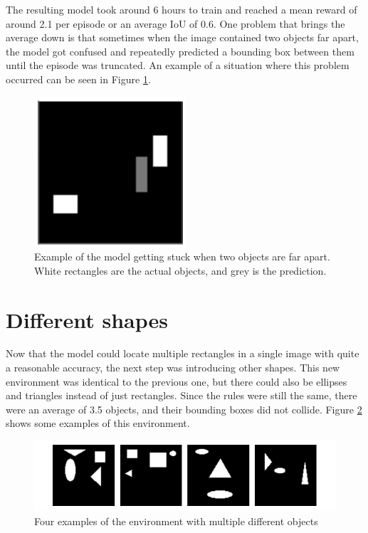 \documentclass[
  digital,     %
  oneside,     %
  nosansbold,  %
  nocolorbold, %
  lof,         %
  lot,         %
]{fithesis4}
\begin{document}
The resulting model took around 6 hours to train and reached a mean reward of around 2.1 per episode or an average IoU of 0.6. One problem that brings the average down is that sometimes when the image contained two objects far apart, the model got confused and repeatedly predicted a bounding box between them until the episode was truncated. An example of a situation where this problem occurred can be seen in Figure \ref{fig:v3_stuck}.

\begin{figure}
    \centering
    \includegraphics[width=0.5\linewidth]{results/v3_stuck.png}
    \caption{Example of the model getting stuck when two objects are far apart. White rectangles are the actual objects, and grey is the prediction.}
    \label{fig:v3_stuck}
\end{figure}

\section{Different shapes}
\label{sec:different_shaps}
Now that the model could locate multiple rectangles in a single image with quite a reasonable accuracy, the next step was introducing other shapes. This new environment was identical to the previous one, but there could also be ellipses and triangles instead of just rectangles. Since the rules were still the same, there were an average of 3.5 objects, and their bounding boxes did not collide. Figure \ref{fig:env4} shows some examples of this environment.

\begin{figure}
    \includegraphics[width=1\linewidth]{env_examples/env4.pdf}
    \caption{Four examples of the environment with multiple different objects}
    \label{fig:env4}
\end{figure}
 
\end{document}
